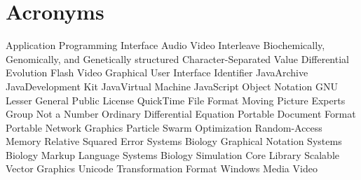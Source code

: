 \chapter{Acronyms}
\begin{acronym}[SBSCL]
  \setlength{\parskip}{0ex}
  \setlength{\itemsep}{0.25ex}
        {Application Programming Interface}
        {Audio Video Interleave}
       {Biochemically, Genomically, and Genetically structured}
        {Character-Separated Value}
         {Differential Evolution}
        {Flash Video}
        {Graphical User Interface}
         {Identifier}
        {Java\TTra Archive}
        {Java\TTra Development Kit}
        {Java\TTra Virtual Machine}
       {JavaScript Object Notation}
       {GNU Lesser General Public License}
        {QuickTime File Format}
        {Moving Picture Experts Group}
        {Not a Number}
        {Ordinary Differential Equation}
        {Portable Document Format}
        {Portable Network Graphics}
        {Particle Swarm Optimization}
        {Random-Access Memory}
        {Relative Squared Error}
       {Systems Biology Graphical Notation}
       {Systems Biology Markup Language}
      {Systems Biology Simulation Core Library}
        {Scalable Vector Graphics}
        {Unicode Transformation Format}
        {Windows Media Video}
\end{acronym}
